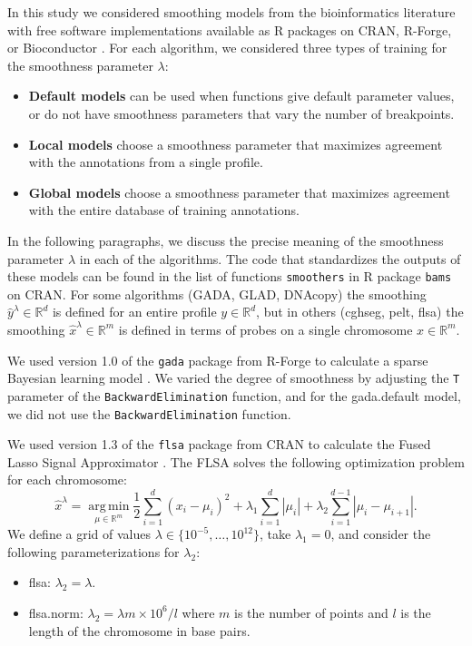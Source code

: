 \documentclass[10pt]{bmc_article}
\newcommand{\citep}[1]{\cite{#1}}
\newcommand{\argmin}{\operatorname*{arg\, min}}
\newcommand{\model}[1]{#1}
\newcommand{\code}[1]{\texttt{#1}}
\newcommand{\package}[1]{\texttt{#1}}
\newcommand{\RR}{\mathbb R}
\newenvironment{bmcformat}{\begin{raggedright}\baselineskip20pt\sloppy\setboolean{publ}{false}}{\end{raggedright}\baselineskip20pt\sloppy}
\begin{document}
\begin{bmcformat}
In this study we considered smoothing models from the bioinformatics
literature with free software implementations available as R packages
on CRAN, R-Forge, or Bioconductor \citep{R,R-Forge,Bioconductor}. For
each algorithm, we considered three types of training for the
smoothness parameter $\lambda$:
\begin{itemize}
\item \textbf{Default models} can be used when functions give default
  parameter values, or do not have smoothness parameters that vary the
  number of breakpoints.
\item \textbf{Local models} choose a smoothness parameter that
  maximizes agreement with the annotations from a single profile.
\item \textbf{Global models} choose a smoothness parameter
  that maximizes agreement with the entire database of training
  annotations.
\end{itemize}
In the following paragraphs, we discuss the precise meaning of the
smoothness parameter $\lambda$ in each of the algorithms. The code
that standardizes the outputs of these models can be found in the list
of functions \code{smoothers} in R package \package{bams} on CRAN. For
some algorithms (GADA, GLAD, DNAcopy) the smoothing $\hat y^\lambda\in\RR^d$
is defined for an entire profile $y\in\RR^d$, but in others (cghseg,
pelt, flsa) the smoothing $\hat x^\lambda\in\RR^m$ is defined in terms
of probes on a single chromosome $x\in\RR^m$.

We used version 1.0 of the \package{gada} package from R-Forge to
calculate a sparse Bayesian learning model \cite{gada}. We varied
the degree of smoothness by adjusting the \code{T} parameter of the
\code{BackwardElimination} function, and for the \model{gada.default}
model, we did not use the \code{BackwardElimination} function.

We used version 1.3 of the \package{flsa} package from CRAN to
calculate the Fused Lasso Signal Approximator
\cite{fused-lasso-path}. The FLSA solves the following optimization
problem for each chromosome:
\begin{equation}
  \label{eq:flsa}
  \hat x^\lambda = 
\argmin_{\mu\in\RR^m} 
\frac 1 2 \sum_{i=1}^d (x_i-\mu_i)^2
+\lambda_1\sum_{i=1}^d|\mu_i|
+\lambda_2\sum_{i=1}^{d-1}|\mu_i-\mu_{i+1}|.
\end{equation}
We define a grid of values $\lambda\in\{10^{-5},\dots,10^{12}\}$, take
$\lambda_1=0$, and consider the following parameterizations for
$\lambda_2$:
\begin{itemize}
\item \model{flsa}: $\lambda_2=\lambda$.
\item \model{flsa.norm}: $\lambda_2=\lambda m \times 10^6/l$ where
  $m$ is the number of points and $l$ is the length of the chromosome
  in base pairs.
\end{itemize}



\end{bmcformat}
\end{document}
